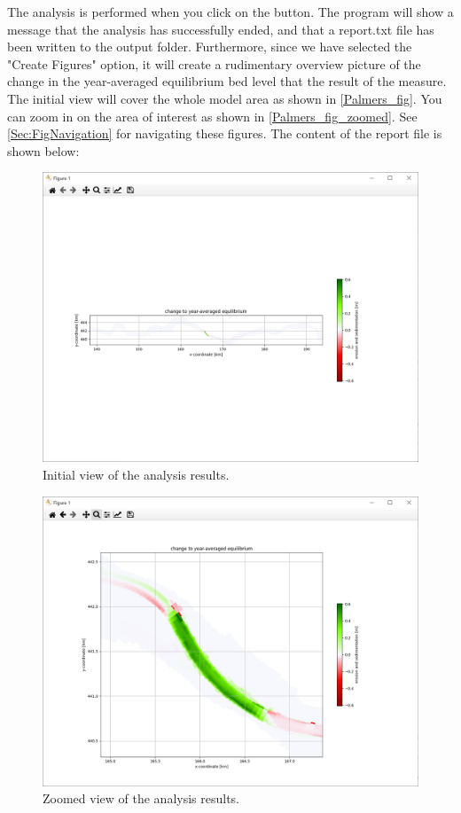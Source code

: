 The \dfmi analysis is performed when you click on the  button.
The program will show a message that the analysis has successfully ended, and that a report.txt file has been written to the output folder.
Furthermore, since we have selected the "Create Figures" option, it will create a rudimentary overview picture of the change in the year-averaged equilibrium bed level that the result of the measure.
The initial view will cover the whole model area as shown in \autoref{Palmers_fig}.
You can zoom in on the area of interest as shown in \autoref{Palmers_fig_zoomed}.
See \autoref{Sec:FigNavigation} for navigating these figures.
The content of the report file is shown below:

\begin{figure}
\center
\includegraphics[width=\textwidth]{figures/Palmerswaard_fig.png}
\caption{Initial view of the analysis results.}
\label{Palmers_fig}
\end{figure}

\begin{figure}
\center
\includegraphics[width=\textwidth]{figures/Palmerswaard_fig_zoomed.png}
\caption{Zoomed view of the analysis results.}
\label{Palmers_fig_zoomed}
\end{figure}

